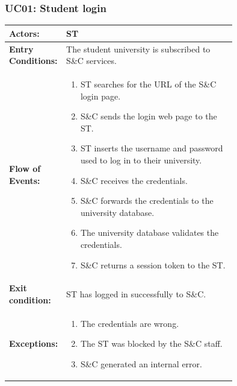 \subsubsection{UC01: Student login}
\label{subsubsec:student-login}
\begin{center}
    \begin{longtable}{|l|p{0.75\linewidth}|}
        \hline
        \textbf{Actors:}           & ST                                                                            \\
        \hline
        \textbf{Entry Conditions:} & The student university is subscribed to S\&C services.                        \\
        \hline
        \textbf{Flow of Events:}   & \begin{enumerate}
                                         \item ST searches for the URL of the S\&C login page.
                                         \item S\&C sends the login web page to the ST.
                                         \item ST inserts the username and password used to log in to their university.
                                         \item S\&C receives the credentials.
                                         \item S\&C forwards the credentials to the university database.
                                         \item The university database validates the credentials.
                                         \item S\&C returns a session token to the ST.
                                     \end{enumerate} \\
        \hline
        \textbf{Exit condition:}   & ST has logged in successfully to S\&C.                                        \\
        \hline
        \textbf{Exceptions:}       & \begin{enumerate}
                                         \item The credentials are wrong.
                                         \item The ST was blocked by the S\&C staff.
                                         \item S\&C generated an internal error.
                                     \end{enumerate}                                    \\
        \hline
    \end{longtable}
\end{center}

